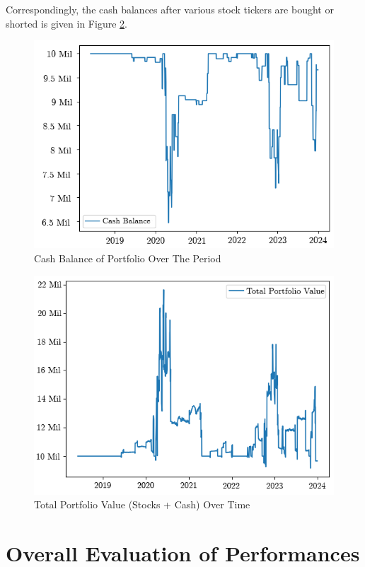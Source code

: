\documentclass[a4paper,12pt]{report}
\numberwithin{equation}{section}
\theoremstyle{definition}
\begin{document}
Correspondingly, the cash balances after various stock tickers are bought or shorted is given in Figure \ref{fig:Cash Balance of Portfolio}.
\begin{figure}[H]
  \centerline{\includegraphics[width=13cm]{LR Cash Balance}}
  \caption{Cash Balance of Portfolio Over The Period}
  \label{fig:Cash Balance of Portfolio}
\end{figure}

\begin{figure}[H]
  \centerline{\includegraphics[width=13cm]{Total Portfolio Value LR}}
  \caption{Total Portfolio Value (Stocks + Cash) Over Time}
  \label{fig:Cash Balance of Portfolio}
\end{figure}



\section{Overall Evaluation of Performances}
\end{document}
